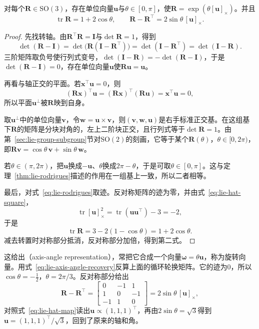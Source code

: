 \begin{theorem}[轴角表示]
\label{thm:lie-axis-angle}
对每个$\bm R\in\mathrm{SO}(3)$，存在单位向量$\bm u$与$\theta\in[0,\pi]$，使$\bm R=\exp(\theta[\bm u]_\times)$。并且
\begin{equation}
 \operatorname{tr}\bm R=1+2\cos\theta,\qquad \bm R-\bm R^\top=2\sin\theta\,[\bm u]_\times.
 \label{eq:lie-axis-angle-recovery}
\end{equation}
\end{theorem}

\begin{proof}
先找转轴。由$\bm R^\top\bm R=\bm I$与$\det\bm R=1$，得到
\[
\det(\bm R-\bm I)=\det\bigl(\bm R(\bm I-\bm R^\top)\bigr)
=\det(\bm I-\bm R^\top)=\det(\bm I-\bm R).
\]
三阶矩阵取负号使行列式变号，$\det(\bm I-\bm R)=-\det(\bm R-\bm I)$，于是$\det(\bm R-\bm I)=0$，存在单位向量$\bm u$使$\bm R\bm u=\bm u$。

再看与轴正交的平面。若$\bm x^\top\bm u=0$，则
\[
(\bm R\bm x)^\top\bm u=(\bm R\bm x)^\top(\bm R\bm u)=\bm x^\top\bm u=0,
\]
所以平面$\bm u^\perp$被$\bm R$映到自身。

取$\bm u^\perp$中的单位向量$\bm v$，令$\bm w=\bm u\times\bm v$，则$(\bm v,\bm w,\bm u)$是右手标准正交基。在这组基下$\bm R$的矩阵是分块对角的，左上二阶块正交，且行列式等于$\det\bm R=1$。由第~\ref{sec:lie-group-subgroup}节对$\mathrm{SO}(2)$的刻画，它等于某个$\bm R(\theta)$，$\theta\in[0,2\pi)$，即$\bm R\bm v=\cos\theta\,\bm v+\sin\theta\,\bm w$。

若$\theta\in(\pi,2\pi)$，把$\bm u$换成$-\bm u$、$\theta$换成$2\pi-\theta$，于是可取$\theta\in[0,\pi]$。这与定理~\ref{thm:lie-rodrigues}描述的作用在一组基上一致，所以二者相等。

最后，对式~\eqref{eq:lie-rodrigues}取迹。反对称矩阵的迹为零，并由式~\eqref{eq:lie-hat-square}，
\[
\operatorname{tr}[\bm u]_\times^2=\operatorname{tr}(\bm u\bm u^\top)-3=-2,
\]
于是
\[
\operatorname{tr}\bm R=3-2(1-\cos\theta)=1+2\cos\theta.
\]
减去转置时对称部分抵消，反对称部分加倍，得到第二式。
\end{proof}

这给出（axis-angle representation），常把它合成一个向量$\bm\omega=\theta\bm u$，称为旋转向量。用式~\eqref{eq:lie-axis-angle-recovery}反算上面的循环轮换矩阵。它的迹为$0$，所以$\cos\theta=-\frac12$，$\theta=2\pi/3$。反对称部分给出
\[
\bm R-\bm R^\top=\begin{bmatrix}0&-1&1\\1&0&-1\\-1&1&0\end{bmatrix}
=2\sin\theta\,[\bm u]_\times,
\]
对照式~\eqref{eq:lie-hat-map}读出$\bm u\propto(1,1,1)^\top$，再由$2\sin\theta=\sqrt3$得到$\bm u=(1,1,1)^\top/\sqrt3$，回到了原来的轴和角。

